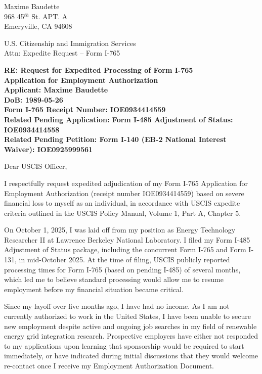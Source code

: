 \documentclass[12pt,letterpaper]{article}
\newcommand{\myFirstName}[0]{Maxime}
\newcommand{\myLastName}[0]{Baudette}
\newcommand{\myDOB}[0]{1989-05-26}
\newcommand{\myAddress}[0]{%
\myFirstName {} \myLastName\\
968 45$^{th}$ St. APT. A\\
Emeryville, CA 94608
}
\newcommand{\USCISaddress}[0]{%
U.S. Citizenship and Immigration Services\\
Attn: Expedite Request – Form I-765}
\newcommand{\myEBcase}[0]{IOE0925999561}
\newcommand{\myAOScase}[0]{IOE0934414558}
\newcommand{\myEADcase}[0]{IOE0934414559}
\begin{document}
\setcounter{page}{1}
\pagestyle{fancy}
\fancyhf{}
\rhead{\myFirstName {} \myLastName}


\myAddress

\USCISaddress

\textbf{RE: Request for Expedited Processing of Form I-765 \\Application for Employment Authorization} \\
\textbf{Applicant: \myFirstName {} \myLastName} \\
\textbf{DoB: \myDOB} \\
\textbf{Form I-765 Receipt Number: \myEADcase} \\
\textbf{Related Pending Application: Form I-485 Adjustment of Status: \myAOScase} \\
\textbf{Related Pending Petition: Form I-140 (EB-2 National Interest Waiver): \myEBcase}

Dear USCIS Officer,

I respectfully request expedited adjudication of my Form I-765 Application for Employment Authorization (receipt number \myEADcase) based on severe financial loss to myself as an individual, in accordance with USCIS expedite criteria outlined in the USCIS Policy Manual, Volume 1, Part A, Chapter 5.

On October 1, 2025, I was laid off from my position as Energy Technology Researcher II at Lawrence Berkeley National Laboratory. I filed my Form I-485 Adjustment of Status package, including the concurrent Form I-765 and Form I-131, in mid-October 2025. At the time of filing, USCIS publicly reported processing times for Form I-765 (based on pending I-485) of several months, which led me to believe standard processing would allow me to resume employment before my financial situation became critical.

Since my layoff over five months ago, I have had no income. As I am not currently authorized to work in the United States, I have been unable to secure new employment despite active and ongoing job searches in my field of renewable energy grid integration research. Prospective employers have either not responded to my applications upon learning that sponsorship would be required to start immediately, or have indicated during initial discussions that they would welcome re-contact once I receive my Employment Authorization Document.
\end{document}
